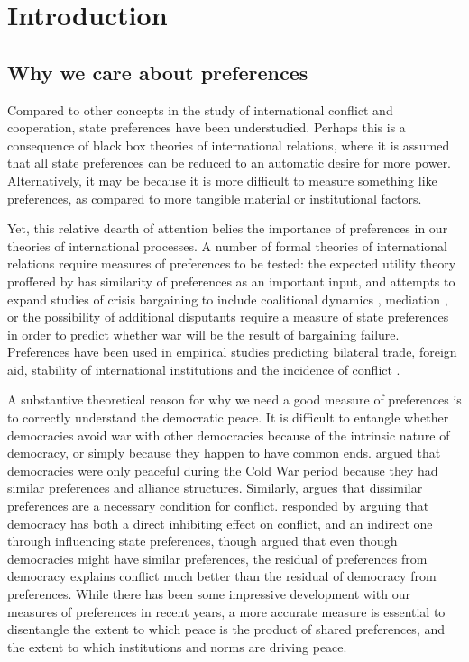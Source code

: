 
\section*{Introduction}

\subsection*{Why we care about preferences}

Compared to other concepts in the study of international conflict and cooperation, state preferences have been understudied. Perhaps this is a consequence of black box theories of international relations, where it is assumed that all state preferences can be reduced to an automatic desire for more power. Alternatively, it may be because it is more difficult to measure something like preferences, as compared to more tangible material or institutional factors.

Yet, this relative dearth of attention belies the importance of preferences in our theories of international processes. A number of formal theories of international relations require measures of preferences to be tested: the expected utility theory proffered by \citep{buenodemesquita:1983} has similarity of preferences as an important input, and attempts to expand studies of crisis bargaining to include coalitional dynamics \citep{wolford:2014}, mediation \citep{kydd:2003}, or the possibility of additional disputants \citep{gallop:2017} require a measure of state preferences in order to predict whether war will be the result of bargaining failure. Preferences have been used in empirical studies predicting bilateral trade, foreign aid, stability of international institutions and the incidence of conflict \citep{kastner:2007, derouen:heo:2004, stone:2004, gartzke:2007, braumoeller:2008}. 

A substantive theoretical reason for why we need a good measure of preferences is to correctly understand the democratic peace. It is difficult to entangle whether democracies avoid war with other democracies because of the intrinsic nature of democracy, or simply because they happen to have common ends. \citet{farber:gowa:1995} argued that democracies were only peaceful during the Cold War period because they had similar preferences and alliance structures. Similarly, \citet{gartzke:1998} argues that dissimilar preferences are a necessary condition for conflict. \citet{oneal:russett:1999e} responded by arguing that democracy has both a direct inhibiting effect on conflict, and an indirect one through influencing state preferences, though \citet{gartzke:2000} argued that even though democracies might have similar preferences, the residual of preferences from democracy explains conflict much better than the residual of democracy from preferences. While there has been some impressive development with our measures of preferences in recent years, a more accurate measure is essential to disentangle the extent to which peace is the product of shared preferences, and the extent to which institutions and norms are driving peace.

